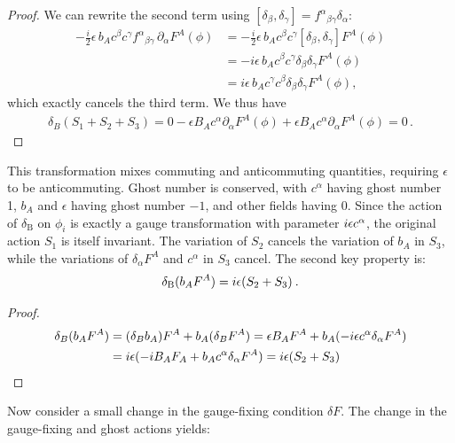 \begin{tcolorbox}[breakable]
\begin{proof}
		We can rewrite the second term using $[\delta_\beta, \delta_\gamma] = f^{\alpha}{}_{\beta\gamma} \delta_\alpha$:
		\begin{align}
			- \frac{i}{2} \epsilon \, b_A c^\beta c^\gamma f^{\alpha}{}_{\beta\gamma} \, \partial_\alpha F^A(\phi)
			&= - \frac{i}{2} \epsilon \, b_A c^\beta c^\gamma [\delta_\beta, \delta_\gamma] F^A(\phi) \\
			&= - i \epsilon \, b_A c^\beta c^\gamma \delta_\beta \delta_\gamma F^A(\phi) \\
			&= i \epsilon \, b_A c^\gamma c^\beta \delta_\beta \delta_\gamma F^A(\phi) ,
		\end{align}
		which exactly cancels the third term. We thus have
		\begin{align}
			\delta_B (S_1 + S_2 + S_3)
			= 0 - \epsilon B_A c^\alpha \partial_\alpha F^A(\phi)
			+ \epsilon B_A c^\alpha \partial_\alpha F^A(\phi)
			= 0 \, .
		\end{align}
	\end{proof}
\end{tcolorbox}
This transformation mixes commuting and anticommuting quantities, requiring $\epsilon$ to be anticommuting. Ghost number is conserved, with $c^{\alpha}$ having ghost number 1, $b_{A}$ and $\epsilon$ having ghost number $-1$, and other fields having 0. Since the action of $\delta_{\mathrm{B}}$ on $\phi_{i}$ is exactly a gauge transformation with parameter $i \epsilon c^{\alpha}$, the original action $S_{1}$ is itself invariant. The variation of $S_{2}$ cancels the variation of $b_{A}$ in $S_{3}$, while the variations of $\delta_{\alpha} F^{A}$ and $c^{\alpha}$ in $S_{3}$ cancel.
The second key property is:
\begin{equation}
	\delta_{\mathrm{B}}(b_{A} F^{A})=i \epsilon(S_{2}+S_{3}) \:. \label{4.2.7}
\end{equation}
\begin{tcolorbox}
	\begin{proof}
		\begin{align}
			\delta_B(b_A F^A) &= (\delta_B b_A)F^A + b_A(\delta_B F^A) = \epsilon B_A F^A + b_A(-i\epsilon c^\alpha \delta_\alpha F^A)\notag\\
			&= i\epsilon(-iB_A F_A + b_A c^\alpha \delta_\alpha F^A) = i\epsilon(S_2 + S_3)
		\end{align}
	\end{proof}
\end{tcolorbox}
Now consider a small change in the gauge-fixing condition $\delta F$. The change in the gauge-fixing and ghost actions yields:
